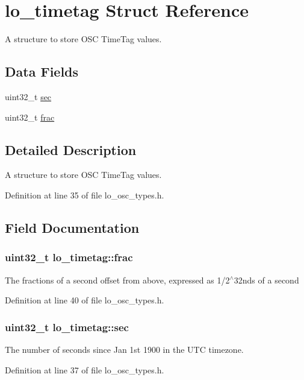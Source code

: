 \hypertarget{structlo__timetag}{\section{lo\+\_\+timetag Struct Reference}
\label{structlo__timetag}
}


A structure to store O\+S\+C Time\+Tag values.  


\subsection*{Data Fields}
\begin{DoxyCompactItemize}
\item 
uint32\+\_\+t \hyperlink{structlo__timetag_a917e786d87a5304c5e7ea4d3c44f7cf4}{sec}
\item 
uint32\+\_\+t \hyperlink{structlo__timetag_a1acce1a3dd765a15c47f6eb76cb96c27}{frac}
\end{DoxyCompactItemize}


\subsection{Detailed Description}
A structure to store O\+S\+C Time\+Tag values. 

Definition at line 35 of file lo\+\_\+osc\+\_\+types.\+h.



\subsection{Field Documentation}
\hypertarget{structlo__timetag_a1acce1a3dd765a15c47f6eb76cb96c27}{
\subsubsection[{frac}]{\setlength{\rightskip}{0pt plus 5cm}uint32\+\_\+t lo\+\_\+timetag\+::frac}}\label{structlo__timetag_a1acce1a3dd765a15c47f6eb76cb96c27}
The fractions of a second offset from above, expressed as 1/2$^\wedge$32nds of a second 

Definition at line 40 of file lo\+\_\+osc\+\_\+types.\+h.

\hypertarget{structlo__timetag_a917e786d87a5304c5e7ea4d3c44f7cf4}{
\subsubsection[{sec}]{\setlength{\rightskip}{0pt plus 5cm}uint32\+\_\+t lo\+\_\+timetag\+::sec}}\label{structlo__timetag_a917e786d87a5304c5e7ea4d3c44f7cf4}
The number of seconds since Jan 1st 1900 in the U\+T\+C timezone. 

Definition at line 37 of file lo\+\_\+osc\+\_\+types.\+h.

